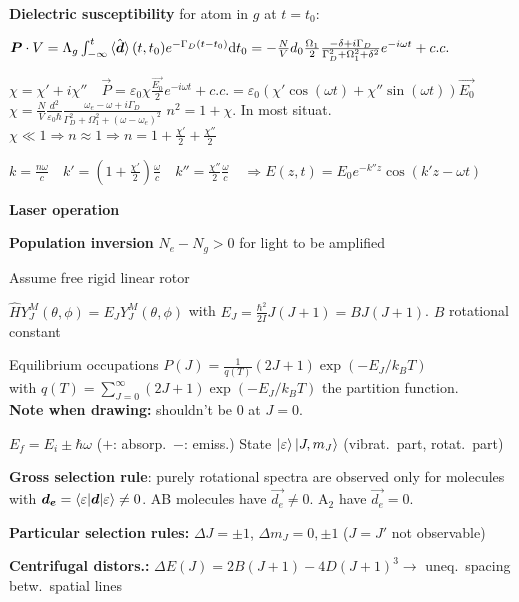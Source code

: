 \begin{squishlist}
    \textbf{Dielectric susceptibility} \qquad for atom in $g$ at $t=t_0$:
    \item $\bm{P} \cdot V  = \Lambda_g \int_{-\infty}^{t} \braket{\hat{\bm{d}}}(t,t_0) e^{{-\Gamma_D(t-t_0)}} \textrm{d} t_0 = - \frac{N}{V}d_0 \frac{\Omega_1}{2} \frac{-\delta + i \Gamma_D}{\Gamma_D^2 + \Omega_1^2 + \delta^2}e^{-i\omega t} + c.c.$ 
    \item $\chi = \chi' + i \chi'' \quad \vec{P} = \varepsilon_0 \chi \frac{\vec{E_0}}{2} e^{-i \omega t} +c.c. = \varepsilon_0 (\chi' \cos(\omega t) + \chi'' \sin(\omega t)) \vec{E_0} $\\
    $\chi = \frac{N}{V} \frac{d^2}{\varepsilon_0 \hbar} \frac{\omega_e - \omega + i\Gamma_D}{\Gamma_D^2 + \Omega_1^2 + (\omega - \omega_e)^2}$ \quad $n^2 = 1 + \chi$. In most situat.\ $\chi \ll 1 \Rightarrow n \approx 1 \Rightarrow n = 1 + \frac{\chi'}{2} + \frac{\chi''}{2}$
    \item $k = \frac{n \omega}{c} \quad k'=\left(1 + \frac{\chi'}{2}\right)\frac{\omega }{c} \quad k'' = \frac{\chi''}{2}\frac{\omega}{c} \quad \Longrightarrow E(z,t) = E_0 e^{-k'' z} \cos(k'z - \omega t)$
\end{squishlist}

\squishline

\textbf{Laser operation}
\begin{squishlist}
    \item \textbf{Population inversion} $N_e - N_g > 0$ for light to be amplified
\end{squishlist}

\begin{squishlist}
    \item Assume free rigid linear rotor
    \item $\hat{H} Y_J^M(\theta, \phi) = E_J Y_J^M(\theta, \phi)$ with $E_J = \frac{\hbar^2}{2I} J (J+1) = B J(J+1)$. $B$ rotational constant
    \item Equilibrium occupations $P(J) = \frac{1}{q(T)} (2J+1) \exp(-E_J / k_B T)$ \\
    with $q(T) = \sum_{J=0}^{\infty} (2J+1) \exp(-E_J / k_B T)$ the partition function. \\ 
    \textbf{Note when drawing:} shouldn't be $0$ at $J=0$.

    \item $E_f = E_i \pm \hbar \omega$ ($+$: absorp.\, $-$: emiss.) \hspace{-0.3cm}
    \squishsep State $\ket{\varepsilon} \ket{J, m_J}$ (\elec vibrat.\ part, rotat.\ part)
    \item \textbf{Gross selection rule}: purely rotational spectra are observed only for molecules with $\bm{d_e} = \braket{\varepsilon|\bm{d}|\varepsilon} \neq 0$. AB molecules have $\vec{d_e} \neq 0$. A$_2$ have $\vec{d_e} = 0$.
    \item \textbf{Particular selection rules:} $\Delta J = \pm 1$, $\Delta m_J = 0, \pm 1$ ($J=J'$ not observable)
    \item \textbf{Centrifugal distors.:} $\Delta E(J) = 2B (J+1) - 4D(J+1)^3 \rightarrow$ uneq.\ spacing betw.\ spatial lines
\end{squishlist}

